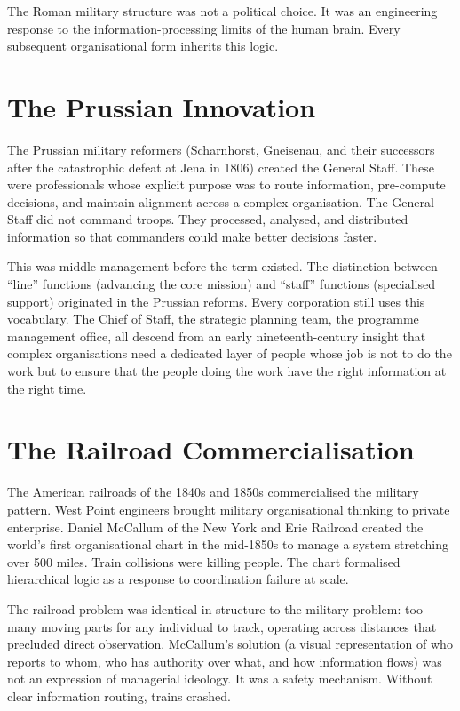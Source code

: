 \begin{keyinsight}
The Roman military structure was not a political choice. It was an engineering response to the information-processing limits of the human brain. Every subsequent organisational form inherits this logic.
\end{keyinsight}

\section{The Prussian Innovation}

The Prussian military reformers (Scharnhorst, Gneisenau, and their successors after the catastrophic defeat at Jena in 1806) created the General Staff. These were professionals whose explicit purpose was to route information, pre-compute decisions, and maintain alignment across a complex organisation. The General Staff did not command troops. They processed, analysed, and distributed information so that commanders could make better decisions faster.

This was middle management before the term existed. The distinction between ``line'' functions (advancing the core mission) and ``staff'' functions (specialised support) originated in the Prussian reforms. Every corporation still uses this vocabulary. The Chief of Staff, the strategic planning team, the programme management office, all descend from an early nineteenth-century insight that complex organisations need a dedicated layer of people whose job is not to do the work but to ensure that the people doing the work have the right information at the right time.

\section{The Railroad Commercialisation}

The American railroads of the 1840s and 1850s commercialised the military pattern. West Point engineers brought military organisational thinking to private enterprise. Daniel McCallum of the New York and Erie Railroad created the world's first organisational chart in the mid-1850s to manage a system stretching over 500 miles. Train collisions were killing people. The chart formalised hierarchical logic as a response to coordination failure at scale.

The railroad problem was identical in structure to the military problem: too many moving parts for any individual to track, operating across distances that precluded direct observation. McCallum's solution (a visual representation of who reports to whom, who has authority over what, and how information flows) was not an expression of managerial ideology. It was a safety mechanism. Without clear information routing, trains crashed.

